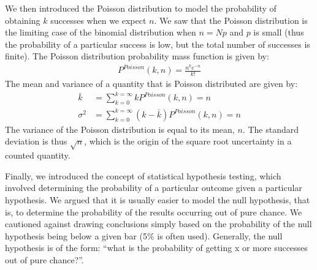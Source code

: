 We then introduced the Poisson distribution to model the probability of obtaining $k$ successes when we expect $n$. We saw that the Poisson distribution is the limiting case of the binomial distribution when $n=Np$ and $p$ is small (thus the probability of a particular success is low, but the total number of successes is finite). The Poisson distribution probability mass function is given by:
\begin{align*}
 P^{Poisson}(k,n)=\frac{n^k e^{-n}}{k!} 
\end{align*}  
The mean and variance of a quantity that is Poisson distributed are given by:
\begin{align}
\bar k &= \sum_{k=0}^{k=\infty}kP^{Poisson}(k,n)=n\\
\sigma^2 &= \sum_{k=0}^{k=\infty}(k-\bar k)P^{Poisson}(k,n)=n
\end{align}
The variance of the Poisson distribution is equal to its mean, $n$. The standard deviation is thus $\sqrt{n}$, which is the origin of the square root uncertainty in a counted quantity.

Finally, we introduced the concept of statistical hypothesis testing, which involved determining the probability of a particular outcome given a particular hypothesis. We argued that it is usually easier to model the null hypothesis, that is, to determine the probability of the results occurring out of pure chance. We cautioned against drawing conclusions simply based on the probability of the null hypothesis being below a given bar (5\% is often used). Generally, the null hypothesis is of the form: ``what is the probability of getting x or more successes out of pure chance?''.